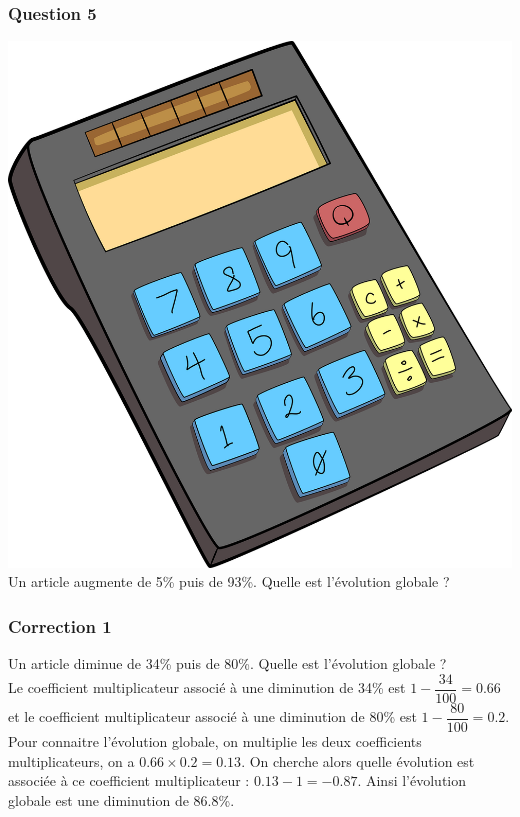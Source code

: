 \documentclass[15pt, mathserif]{beamer}
\begin{document}
\begin{frame} 
	\frametitle{Question 5}
\includegraphics[scale=0.01]{calculatrice} Un article augmente de 5\% puis de 93\%. Quelle est l'évolution globale ?\end{frame}


\begin{frame}
\vspace{-10mm}
	\frametitle{Correction 1}
\vspace*{1cm} Un article diminue de 34\% puis de 80\%. Quelle est l'évolution globale ? \\ Le coefficient multiplicateur associé à une diminution de 34\% est $1-\dfrac{34}{100} = 0.66$ et le coefficient multiplicateur associé à une diminution de 80\% est $1-\dfrac{80}{100} = 0.2$. Pour connaitre l'évolution globale, on multiplie les deux coefficients multiplicateurs, on a $ 0.66 \times 0.2=0.13$. On cherche alors quelle évolution est associée à ce coefficient multiplicateur : $0.13-1 =-0.87$. Ainsi l'évolution globale est une diminution de 86.8\%. 
 \begin{center} 
 \end{center}\end{frame}
\end{document}
